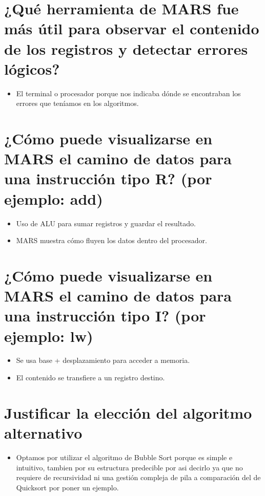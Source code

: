 \documentclass[12pt]{article}
\begin{document}
\section{¿Qué herramienta de MARS fue más útil para observar el contenido de los registros y 
detectar errores lógicos?}
\begin{itemize}
    \item El terminal o procesador porque nos indicaba dónde se encontraban los errores que teníamos en los algoritmos.
\end{itemize}

\section{¿Cómo puede visualizarse en MARS el camino de datos para una instrucción tipo R?
(por ejemplo: add)}
\begin{itemize}
    \item Uso de ALU para sumar registros y guardar el resultado.
    \item MARS muestra cómo fluyen los datos dentro del procesador.
\end{itemize}

\section{¿Cómo puede visualizarse en MARS el camino de datos para una instrucción tipo I? (por 
ejemplo: lw)}
\begin{itemize}
    \item Se usa base + desplazamiento para acceder a memoria.
    \item El contenido se transfiere a un registro destino.
\end{itemize}

\section{Justificar la elección del algoritmo alternativo}
\begin{itemize}
    \item Optamos por utilizar el algoritmo de Bubble Sort porque es simple e intuitivo, tambien por su estructura predecible por asi decirlo ya que no requiere de recursividad ni una gestión compleja de pila a comparación del de Quicksort por poner un ejemplo.
\end{itemize}
\end{document}
